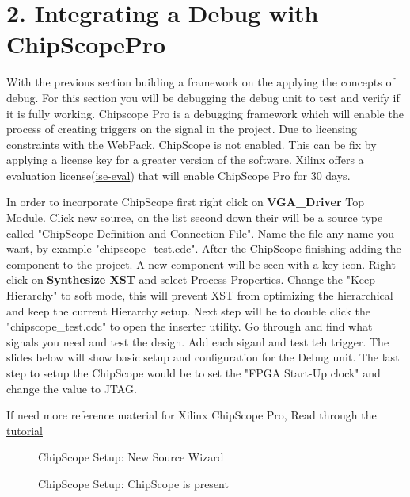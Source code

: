 \documentclass{article}
\begin{document}
\newpage

\section{2. Integrating a Debug with ChipScope\texttrademark Pro}
With the previous section building a framework on the applying the concepts of debug. For this section you will be debugging the debug unit to test and verify if it is fully working. Chipscope Pro is a debugging framework which will enable the process of creating triggers on the signal in the project. Due to licensing constraints with the WebPack, ChipScope is not enabled. This can be fix by applying a license key for a greater version of the software. Xilinx offers a evaluation license(\href{http://www.xilinx.com/products/design-tools/ise-eval.html}{ise-eval}) that will enable ChipScope Pro for 30 days.

In order to incorporate ChipScope first right click on \textbf{VGA\_Driver} Top Module. Click new source, on the list second down their will be a source type called "ChipScope Definition and Connection File". Name the file any name you want, by example "chipscope\_test.cdc". After the ChipScope finishing adding the component to the project. A new component will be seen with a key icon. Right click on \textbf{Synthesize XST} and select Process Properties. Change the "Keep Hierarchy" to soft mode, this will prevent XST from optimizing the hierarchical and keep the current Hierarchy setup. Next step will be to double click the "chipscope\_test.cdc" to open the inserter utility. Go through and find what signals you need and test the design. Add each siganl and test teh trigger. The slides below will show basic setup and configuration for the Debug unit. The last step to setup the ChipScope would be to set the "FPGA Start-Up clock" and change the value to JTAG.

If need more reference material for Xilinx ChipScope Pro, Read through the \href{http://www.xilinx.com/support/documentation/sw_manuals/xilinx14_7/ug750.pdf}{tutorial}

\begin{figure}[!htbp]
  \centering
  \caption{ChipScope Setup: New Source Wizard}
  
\end{figure}
\begin{figure}[!htbp]
  \centering
  \caption{ChipScope Setup: ChipScope is present}
\end{figure}
\end{document}
